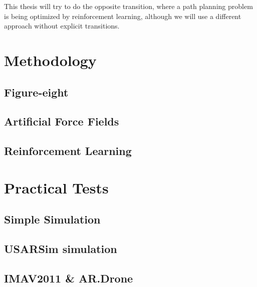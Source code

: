 \documentclass[11pt]{article}
\begin{document}
This thesis will try to do the opposite transition, where a path planning problem is being optimized by reinforcement learning, although we will use a different approach without explicit transitions. 







\section{Methodology}
\label{sec:method}


\subsection{Figure-eight}

\subsection{Artificial Force Fields}

\subsection{Reinforcement Learning}



\section{Practical Tests}
\label{sec:tests}


\subsection{Simple Simulation}

\subsection{USARSim simulation}

\subsection{IMAV2011 \& AR.Drone}
\end{document}
